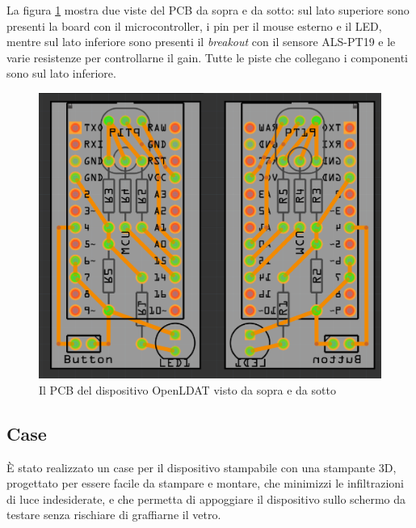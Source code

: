 La figura \ref{fig:pcb} mostra due viste del PCB da sopra e da sotto: sul lato superiore sono presenti la board con il microcontroller, i pin per il mouse esterno e il LED, mentre sul lato inferiore sono presenti il \textit{breakout} con il sensore ALS-PT19 e le varie resistenze per controllarne il gain. Tutte le piste che collegano i componenti sono sul lato inferiore.
\begin{figure}[h]
	\centering
	\includegraphics[width=\textwidth]{Dispositivo_files/openldat_pcb.png}
	\caption{Il PCB del dispositivo OpenLDAT visto da sopra e da sotto}
	\label{fig:pcb}
\end{figure}

\subsection{Case}
È stato realizzato un case per il dispositivo stampabile con una stampante 3D, progettato per essere facile da stampare e montare, che minimizzi le infiltrazioni di luce indesiderate, e che permetta di appoggiare il dispositivo sullo schermo da testare senza rischiare di graffiarne il vetro.

